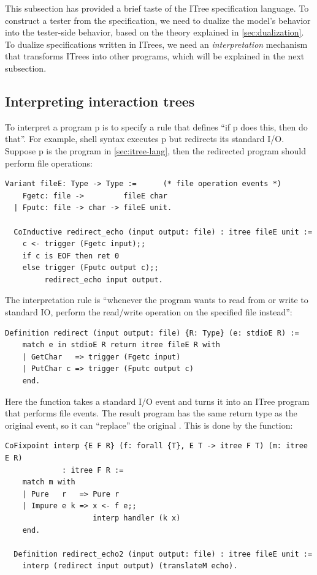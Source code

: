 This subsection has provided a brief taste of the ITree specification language.
To construct a tester from the specification, we need to dualize the model's
behavior into the tester-side behavior, based on the theory explained in
\autoref{sec:dualization}.  To dualize specifications written in ITrees, we need
an {\em interpretation} mechanism that transforms ITrees into other programs,
which will be explained in the next subsection.

\subsection{Interpreting interaction trees}
To interpret a program \ilc p is to specify a rule that defines ``if \ilc p does
this, then do that''.  For example, shell syntax 
executes \inlinec p but redirects its standard I/O.  Suppose \inlinec p is the
 program in \autoref{sec:itree-lang}, then the redirected program
should perform file operations:
\begin{lstlisting}[style=customcoq]
  Variant fileE: Type -> Type :=      (* file operation events *)
    Fgetc: file ->         fileE char
  | Fputc: file -> char -> fileE unit.

  CoInductive redirect_echo (input output: file) : itree fileE unit :=
    c <- trigger (Fgetc input);;
    if c is EOF then ret 0
    else trigger (Fputc output c);;
         redirect_echo input output.
\end{lstlisting}

The interpretation rule is ``whenever the program wants to read from or write to
standard IO, perform the read/write operation on the specified file instead'':
\begin{lstlisting}[style=customcoq]
  Definition redirect (input output: file) {R: Type} (e: stdioE R) :=
    match e in stdioE R return itree fileE R with
    | GetChar   => trigger (Fgetc input)
    | PutChar c => trigger (Fputc output c)
    end.
\end{lstlisting}

Here the  function takes a standard I/O event and turns it into an
ITree program that performs file events.  The result program has the same return
type as the original event, so it can ``replace'' the original .
This is done by the  function:
\begin{lstlisting}[style=customcoq]
  CoFixpoint interp {E F R} (f: forall {T}, E T -> itree F T) (m: itree E R)
             : itree F R :=
    match m with
    | Pure   r   => Pure r
    | Impure e k => x <- f e;;
                    interp handler (k x)
    end.

  Definition redirect_echo2 (input output: file) : itree fileE unit :=
    interp (redirect input output) (translateM echo).
\end{lstlisting}

